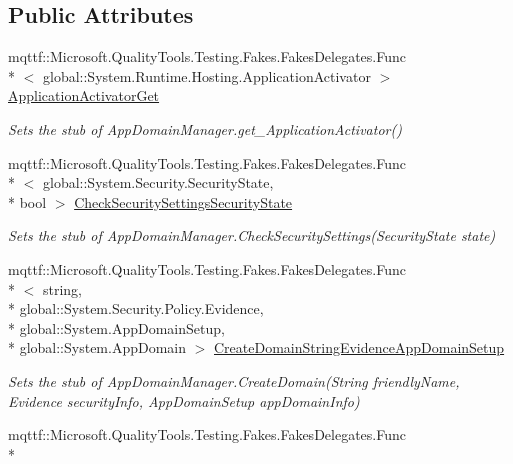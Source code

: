 \subsection*{Public Attributes}
\begin{DoxyCompactItemize}
\item 
mqttf\-::\-Microsoft.\-Quality\-Tools.\-Testing.\-Fakes.\-Fakes\-Delegates.\-Func\\*
$<$ global\-::\-System.\-Runtime.\-Hosting.\-Application\-Activator $>$ \hyperlink{class_system_1_1_fakes_1_1_stub_app_domain_manager_a25438d8abb3cc604a2ec5ad6192cdd53}{Application\-Activator\-Get}
\begin{DoxyCompactList}\small\item\em Sets the stub of App\-Domain\-Manager.\-get\-\_\-\-Application\-Activator()\end{DoxyCompactList}\item 
mqttf\-::\-Microsoft.\-Quality\-Tools.\-Testing.\-Fakes.\-Fakes\-Delegates.\-Func\\*
$<$ global\-::\-System.\-Security.\-Security\-State, \\*
bool $>$ \hyperlink{class_system_1_1_fakes_1_1_stub_app_domain_manager_a7e96747f3775b94f9cddfbc1943de3f4}{Check\-Security\-Settings\-Security\-State}
\begin{DoxyCompactList}\small\item\em Sets the stub of App\-Domain\-Manager.\-Check\-Security\-Settings(\-Security\-State state)\end{DoxyCompactList}\item 
mqttf\-::\-Microsoft.\-Quality\-Tools.\-Testing.\-Fakes.\-Fakes\-Delegates.\-Func\\*
$<$ string, \\*
global\-::\-System.\-Security.\-Policy.\-Evidence, \\*
global\-::\-System.\-App\-Domain\-Setup, \\*
global\-::\-System.\-App\-Domain $>$ \hyperlink{class_system_1_1_fakes_1_1_stub_app_domain_manager_a5537ac3e49346fd1a9380c662aeb642b}{Create\-Domain\-String\-Evidence\-App\-Domain\-Setup}
\begin{DoxyCompactList}\small\item\em Sets the stub of App\-Domain\-Manager.\-Create\-Domain(\-String friendly\-Name, Evidence security\-Info, App\-Domain\-Setup app\-Domain\-Info)\end{DoxyCompactList}\item 
mqttf\-::\-Microsoft.\-Quality\-Tools.\-Testing.\-Fakes.\-Fakes\-Delegates.\-Func\\*

\end{DoxyCompactItemize}

